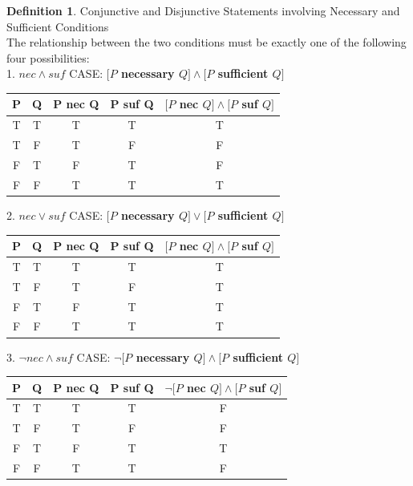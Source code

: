 \documentclass{book}
\theoremstyle{definition}
\newtheorem{definition}{Definition}[section]
\theoremstyle{remark}
\begin{document}
\newpage
\begin{definition}
Conjunctive and Disjunctive Statements involving Necessary and Sufficient Conditions \\

The relationship between the two conditions must be exactly one of the following four possibilities: \\
1. $nec \wedge suf$ CASE: {\bf $[P$ necessary $Q] \wedge [P$ sufficient $Q]$} \\
\begin{center}
\begin{tabular}{|c|c|c|c|c|}
\hline 
P & Q & P nec Q & P suf Q & $[P$ nec $Q] \wedge [P$ suf $Q]$  \\ 
\hline 
T & T & T & T & T\\ 
\hline 
T & F & T & F & F\\ 
\hline 
F & T & F & T & F\\ 
\hline 
F & F & T & T & T\\ 
\hline 
\end{tabular} 
\end{center}

2. $nec \vee suf$ CASE: {\bf $[P$ necessary $Q] \vee [P$ sufficient $Q]$} \\
\begin{center}
\begin{tabular}{|c|c|c|c|c|}
\hline 
P & Q & P nec Q & P suf Q & $[P$ nec $Q] \wedge [P$ suf $Q]$  \\ 
\hline 
T & T & T & T & T\\ 
\hline 
T & F & T & F & T\\ 
\hline 
F & T & F & T & T\\ 
\hline 
F & F & T & T & T\\ 
\hline 
\end{tabular} 
\end{center}

3. $\neg nec \wedge suf$ CASE: {\bf $\neg[P$ necessary $Q] \wedge [P$ sufficient $Q]$} \\
\begin{center}
\begin{tabular}{|c|c|c|c|c|}
\hline 
P & Q & P nec Q & P suf Q & $\neg[P$ nec $Q] \wedge [P$ suf $Q]$  \\ 
\hline 
T & T & T & T & F\\ 
\hline 
T & F & T & F & F\\ 
\hline 
F & T & F & T & T\\ 
\hline 
F & F & T & T & F\\ 
\hline 
\end{tabular} 
\end{center}



\end{definition}
\end{document}
